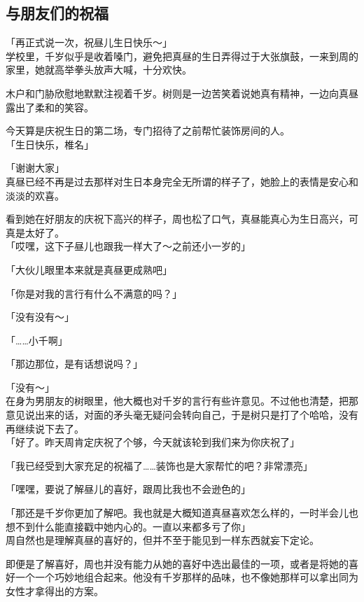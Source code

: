 \subsection{与朋友们的祝福}

「再正式说一次，祝昼儿生日快乐～」\\

学校里，千岁似乎是收着嗓门，避免把真昼的生日弄得过于大张旗鼓，一来到周的家里，她就高举拳头放声大喊，十分欢快。

木户和门胁欣慰地默默注视着千岁。树则是一边苦笑着说她真有精神，一边向真昼露出了柔和的笑容。

今天算是庆祝生日的第二场，专门招待了之前帮忙装饰房间的人。\\

「生日快乐，椎名」

「谢谢大家」\\

真昼已经不再是过去那样对生日本身完全无所谓的样子了，她脸上的表情是安心和淡淡的欢喜。

看到她在好朋友的庆祝下高兴的样子，周也松了口气，真昼能真心为生日高兴，可真是太好了。\\

「哎嘿，这下子昼儿也跟我一样大了～之前还小一岁的」

「大伙儿眼里本来就是真昼更成熟吧」

「你是对我的言行有什么不满意的吗？」

「没有没有～」

「……小千啊」

「那边那位，是有话想说吗？」

「没有～」\\

在身为男朋友的树眼里，他大概也对千岁的言行有些许意见。不过他也清楚，把那意见说出来的话，对面的矛头毫无疑问会转向自己，于是树只是打了个哈哈，没有再继续说下去了。\\

「好了。昨天周肯定庆祝了个够，今天就该轮到我们来为你庆祝了」

「我已经受到大家充足的祝福了……装饰也是大家帮忙的吧？非常漂亮」

「嘿嘿，要说了解昼儿的喜好，跟周比我也不会逊色的」

「那还是千岁你更加了解吧。我也就是大概知道真昼喜欢怎么样的，一时半会儿也想不到什么能直接戳中她内心的。一直以来都多亏了你」\\

周自然也是理解真昼的喜好的，但并不至于能见到一样东西就妄下定论。

即便是了解喜好，周也并没有能力从她的喜好中选出最佳的一项，或者是将她的喜好一个一个巧妙地组合起来。他没有千岁那样的品味，也不像她那样可以拿出同为女性才拿得出的方案。


